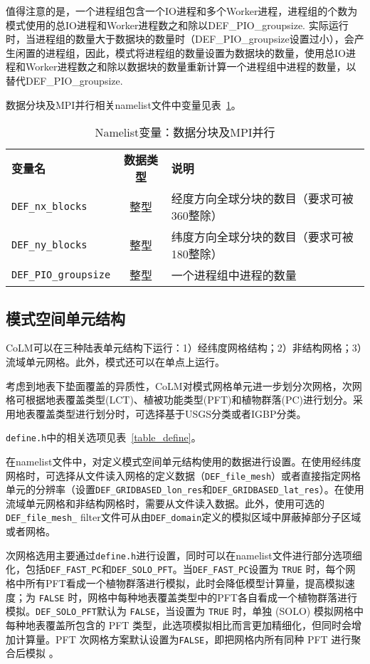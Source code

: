 值得注意的是，一个进程组包含一个IO进程和多个Worker进程，进程组的个数为模式使用的总IO进程和Worker进程数之和除以DEF\_PIO\_groupsize. 实际运行时，当进程组的数量大于数据块的数量时（DEF\_PIO\_groupsize设置过小），会产生闲置的进程组，因此，模式将进程组的数量设置为数据块的数量，使用总IO进程和Worker进程数之和除以数据块的数量重新计算一个进程组中进程的数量，以替代DEF\_PIO\_groupsize.

数据分块及MPI并行相关namelist文件中变量见表~\ref{table_nl_blocks_mpi}。

\begin{table}[!htbp] \small
\caption{Namelist变量：数据分块及MPI并行} \label{table_nl_blocks_mpi}
\centering \renewcommand{\arraystretch}{1.5}
\begin{tabular}{lcp{}}
\toprule
\textbf{变量名} & \textbf{数据类型} & \textbf{说明} \\
\texttt{DEF\_nx\_blocks} & 整型 & 经度方向全球分块的数目（要求可被360整除）\\
\texttt{DEF\_ny\_blocks} & 整型 & 纬度方向全球分块的数目（要求可被180整除）\\
\texttt{DEF\_PIO\_groupsize} & 整型 & 一个进程组中进程的数量 \\
\bottomrule
\end{tabular}
\end{table}

\subsection{模式空间单元结构}

CoLM可以在三种陆表单元结构下运行：1）经纬度网格结构；2）非结构网格；3）流域单元网格。此外，模式还可以在单点上运行。

考虑到地表下垫面覆盖的异质性，CoLM对模式网格单元进一步划分次网格，次网格可根据地表覆盖类型(LCT)、植被功能类型(PFT)和植物群落(PC)进行划分。采用地表覆盖类型进行划分时，可选择基于USGS分类或者IGBP分类。

\texttt{define.h}中的相关选项见表~\ref{table_define}。

在namelist文件中，对定义模式空间单元结构使用的数据进行设置。在使用经纬度网格时，可选择从文件读入网格的定义数据（\texttt{DEF\_file\_mesh}）或者直接指定网格单元的分辨率（设置\texttt{DEF\_GRIDBASED\_lon\_res}和\texttt{DEF\_GRIDBASED\_lat\_res}）。在使用流域单元网格和非结构网格时，需要从文件读入数据。此外，使用可选的\texttt{DEF\_file\_mesh\_\allowbreak} filter文件可从由\texttt{DEF\_domain}定义的模拟区域中屏蔽掉部分子区域或者网格。

次网格选用主要通过\texttt{define.h}进行设置，同时可以在namelist文件进行部分选项细化，包括\texttt{DEF\_FAST\_PC}和\texttt{DEF\_SOLO\_PFT}。当\texttt{DEF\_FAST\_PC}设置为 \texttt{TRUE} 时，每个网格中所有PFT看成一个植物群落进行模拟，此时会降低模型计算量，提高模拟速度；为 \texttt{FALSE} 时，网格中每种地表覆盖类型中的PFT各自看成一个植物群落进行模拟。\texttt{DEF\_SOLO\_PFT}默认为 \texttt{FALSE}，当设置为 \texttt{TRUE} 时，单独 (SOLO) 模拟网格中每种地表覆盖所包含的 PFT 类型，此选项模拟相比而言更加精细化，但同时会增加计算量。PFT 次网格方案默认设置为\texttt{FALSE}，即把网格内所有同种 PFT 进行聚合后模拟 。

